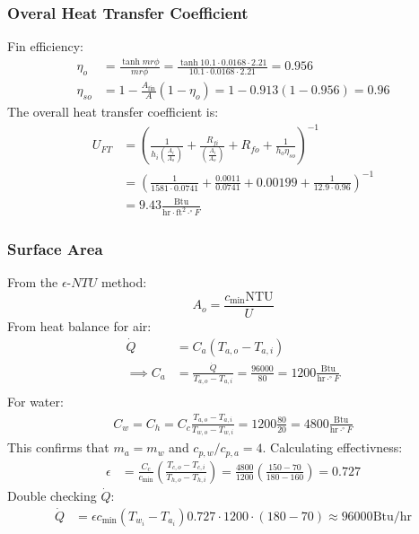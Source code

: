 \subsubsection{Overal Heat Transfer Coefficient}
Fin efficiency:
\begin{align*}
    \eta_{o}  & = \frac{\tanh{mr\phi}}{mr\phi} = \frac{\tanh{10.1 \cdot 0.0168 \cdot 2.21}}{10.1 \cdot 0.0168 \cdot 2.21} = 0.956 \\
    \eta_{so} & = 1 - \frac{A_{\text{fin}}}{A} \left(1 - \eta_o \right) = 1 -  0.913 \left(1 - 0.956\right) = 0.96
\end{align*}
The overall heat transfer coefficient is:
\begin{align*}
    U_{FT} & = \left(\frac{1}{h_i \left(\frac{A_i}{A_o}\right)} + \frac{R_{fi}}{\left(\frac{A_i}{A_o}\right)} + R_{fo} + \frac{1}{h_o \eta_{so}}\right)^{-1} \\
           & = \left(\frac{1}{1581 \cdot 0.0741} + \frac{0.0011}{0.0741} + 0.00199 + \frac{1}{12.9 \cdot 0.96}\right)^{-1}                                   \\
           & = 9.43 \frac{\text{Btu}}{\text{hr} \cdot \text{ft}^2 \cdot ^\circ F}
\end{align*}

\subsubsection{Surface Area}
From the $\epsilon$-$NTU$ method:
\begin{equation*}
    A_o = \frac{c_\text{min} \text{NTU}}{U}
\end{equation*}
From heat balance for air:
\begin{align*}
    \dot{Q}      & = C_a (T_{a, o} - T_{a, i})                                                                                 \\
    \implies C_a & = \frac{\dot{Q}}{T_{a, o} - T_{a, i}} = \frac{96000}{80} = 1200 \frac{\text{Btu}}{\text{hr} \cdot ^\circ F} \\
\end{align*}
For water:
\begin{align*}
    C_w = C_h = C_c \frac{T_{a, o} - T_{a, i}}{T_{w, o} - T_{w, i}} = 1200 \frac{80}{20} = 4800 \frac{\text{Btu}}{\text{hr} \cdot ^\circ F}
\end{align*}
This confirms that $m_a = m_w$ and $c_{p, w}/c_{p, a} = 4$. Calculating effectivness:
\begin{align*}
    \epsilon & = \frac{C_c}{c_{\text{min}}} \left(\frac{T_{c, o} - T_{c, i}}{T_{h, o} - T_{h, i}}\right) = \frac{4800}{1200} \left(\frac{150 - 70}{180 - 160}\right) = 0.727
\end{align*}
Double checking $\dot{Q}$:
\begin{align*}
    \dot{Q} & = \epsilon c_\text{min} (T_{w_i} - T_{a_i}) 0.727 \cdot 1200 \cdot (180 - 70) \approx 96000 \text{Btu/hr}
\end{align*}

